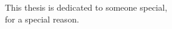 \begin{dedication}
This thesis is dedicated to someone special,\\
for a special reason.\\
\end{dedication}